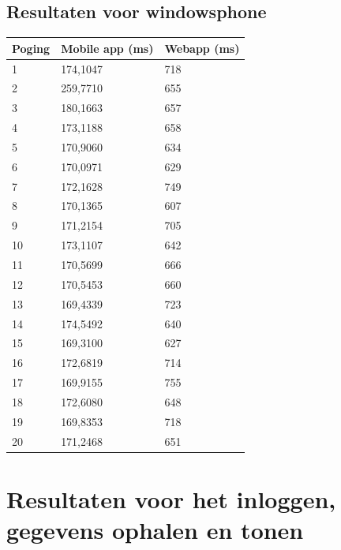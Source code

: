 \documentclass[pdftex,a4paper,12pt,twoside]{report}
\begin{document}
\subsection{Resultaten voor windowsphone}
\begin{center}
    \begin{tabular}{ | l | l | l |}
    \hline
    Poging & Mobile app (ms) & Webapp (ms)
      \\ \hline
      1 & 174,1047 & 718
      \\ \hline
      2 & 259,7710 & 655
      \\ \hline
      3 & 180,1663 & 657
      \\ \hline
      4 & 173,1188 & 658
      \\ \hline
      5 & 170,9060 & 634
      \\ \hline
      6 & 170,0971 & 629
      \\ \hline
      7 & 172,1628 & 749
      \\ \hline
      8 & 170,1365 & 607
      \\ \hline
      9 & 171,2154 & 705
      \\ \hline
      10 & 173,1107 & 642
      \\ \hline
      11 & 170,5699 & 666
      \\ \hline
      12 & 170,5453 & 660
      \\ \hline
      13 & 169,4339 & 723
      \\ \hline
      14 & 174,5492 & 640
      \\ \hline
      15 & 169,3100 & 627
      \\ \hline
      16 & 172,6819 & 714
      \\ \hline
      17 & 169,9155 & 755
      \\ \hline
      18 & 172,6080 & 648
      \\ \hline
      19 & 169,8353 & 718
      \\ \hline
      20 & 171,2468 & 651
      \\ \hline
    \end{tabular}
\end{center}
\newpage
\section{Resultaten voor het inloggen, gegevens ophalen en tonen}
\end{document}

